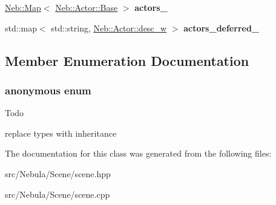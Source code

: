 \begin{DoxyCompactItemize}
\item 
\hypertarget{classNeb_1_1Scene_1_1scene_a34f0ddb235ae741113bbb9f00eb09bdd}{\hyperlink{classNeb_1_1Map}{\-Neb\-::\-Map}$<$ \hyperlink{classNeb_1_1Actor_1_1Base}{\-Neb\-::\-Actor\-::\-Base} $>$ {\bfseries actors\-\_\-}}\label{classNeb_1_1Scene_1_1scene_a34f0ddb235ae741113bbb9f00eb09bdd}

\item 
\hypertarget{classNeb_1_1Scene_1_1scene_a8c73edd38697448bac54460dc3bb877e}{std\-::map$<$ std\-::string, \*
\hyperlink{classNeb_1_1weak__ptr}{\-Neb\-::\-Actor\-::desc\-\_\-w} $>$ {\bfseries actors\-\_\-deferred\-\_\-}}\label{classNeb_1_1Scene_1_1scene_a8c73edd38697448bac54460dc3bb877e}

\end{DoxyCompactItemize}


\subsection{\-Member \-Enumeration \-Documentation}
\hypertarget{classNeb_1_1Scene_1_1scene_a5faf0bba7354d62e05bbfb7de1e79bf4}{\subsubsection[{anonymous enum}]{\setlength{\rightskip}{0pt plus 5cm}anonymous enum}}\label{classNeb_1_1Scene_1_1scene_a5faf0bba7354d62e05bbfb7de1e79bf4}
\begin{DoxyRefDesc}{\-Todo}
\item[{\bf \-Todo}]replace types with inheritance \end{DoxyRefDesc}


\-The documentation for this class was generated from the following files\-:\begin{DoxyCompactItemize}
\item 
src/\-Nebula/\-Scene/scene.\-hpp\item 
src/\-Nebula/\-Scene/scene.\-cpp\end{DoxyCompactItemize}
